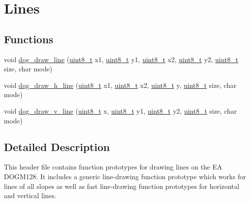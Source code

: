 \hypertarget{group___d_o_g_m128__lines}{\section{Lines}
\label{group___d_o_g_m128__lines}
}
\subsection*{Functions}
\begin{DoxyCompactItemize}
\item 
void \hyperlink{group___d_o_g_m128__lines_gaa65019b0ad1777d5f315e28faf9c703b}{dog\-\_\-draw\-\_\-line} (\hyperlink{group___d_o_g_m128__common_gaba7bc1797add20fe3efdf37ced1182c5}{uint8\-\_\-t} x1, \hyperlink{group___d_o_g_m128__common_gaba7bc1797add20fe3efdf37ced1182c5}{uint8\-\_\-t} y1, \hyperlink{group___d_o_g_m128__common_gaba7bc1797add20fe3efdf37ced1182c5}{uint8\-\_\-t} x2, \hyperlink{group___d_o_g_m128__common_gaba7bc1797add20fe3efdf37ced1182c5}{uint8\-\_\-t} y2, \hyperlink{group___d_o_g_m128__common_gaba7bc1797add20fe3efdf37ced1182c5}{uint8\-\_\-t} size, char mode)
\item 
void \hyperlink{group___d_o_g_m128__lines_gad33474648d863d3e2f569d5c7667bbe8}{dog\-\_\-draw\-\_\-h\-\_\-line} (\hyperlink{group___d_o_g_m128__common_gaba7bc1797add20fe3efdf37ced1182c5}{uint8\-\_\-t} x1, \hyperlink{group___d_o_g_m128__common_gaba7bc1797add20fe3efdf37ced1182c5}{uint8\-\_\-t} x2, \hyperlink{group___d_o_g_m128__common_gaba7bc1797add20fe3efdf37ced1182c5}{uint8\-\_\-t} y, \hyperlink{group___d_o_g_m128__common_gaba7bc1797add20fe3efdf37ced1182c5}{uint8\-\_\-t} size, char mode)
\item 
void \hyperlink{group___d_o_g_m128__lines_gae41da7e6bda7b37f0ad7eb037b64ea26}{dog\-\_\-draw\-\_\-v\-\_\-line} (\hyperlink{group___d_o_g_m128__common_gaba7bc1797add20fe3efdf37ced1182c5}{uint8\-\_\-t} x, \hyperlink{group___d_o_g_m128__common_gaba7bc1797add20fe3efdf37ced1182c5}{uint8\-\_\-t} y1, \hyperlink{group___d_o_g_m128__common_gaba7bc1797add20fe3efdf37ced1182c5}{uint8\-\_\-t} y2, \hyperlink{group___d_o_g_m128__common_gaba7bc1797add20fe3efdf37ced1182c5}{uint8\-\_\-t} size, char mode)
\end{DoxyCompactItemize}


\subsection{Detailed Description}
This header file contains function prototypes for drawing lines on the E\-A D\-O\-G\-M128. It includes a generic line-\/drawing function prototype which works for lines of all slopes as well as fast line-\/drawing function prototypes for horizontal and vertical lines. 


